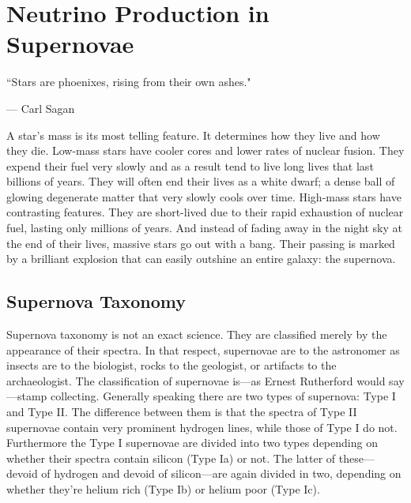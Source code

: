 %
%
%
%


\chapter{Neutrino Production in Supernovae}
	\label{supernovae_chapter}

	\vspace{-0.2in}

	\begin{quoting}
		\noindent \large ``Stars are phoenixes, rising from their own ashes." \normalsize

		--- Carl Sagan
	\end{quoting}

	 A star's mass is its most telling feature. It determines how they live and how they die. Low-mass stars have cooler cores and lower rates of nuclear fusion. They expend their fuel very slowly and as a result tend to live long lives that last billions of years. They will often end their lives as a white dwarf; a dense ball of glowing degenerate matter that very slowly cools over time. High-mass stars have contrasting features. They are short-lived due to their rapid exhaustion of nuclear fuel, lasting only millions of years. And instead of fading away in the night sky at the end of their lives, massive stars go out with a bang. Their passing is marked by a brilliant explosion that can easily outshine an entire galaxy: the supernova.
	
	\section{Supernova Taxonomy}
		Supernova taxonomy is not an exact science. They are classified merely by the appearance of their spectra. In that respect, supernovae are to the astronomer as insects are to the biologist, rocks to the geologist, or artifacts to the archaeologist. The classification of supernovae is---as Ernest Rutherford would say---stamp collecting. 
		Generally speaking there are two types of supernova: Type I and Type II. The difference between them is that the spectra of Type II supernovae contain very prominent hydrogen lines, while those of Type I do not. Furthermore the Type I supernovae are divided into two types depending on whether their spectra contain silicon (Type Ia) or not. The latter of these---devoid of hydrogen and devoid of silicon---are again divided in two, depending on whether they're helium rich (Type Ib) or helium poor (Type Ic).

